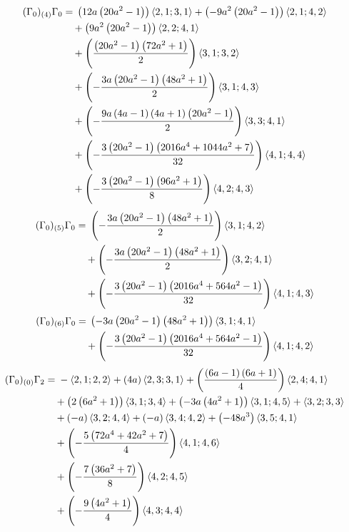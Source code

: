 \begin{align*}
(\Gamma_0)_{(4)}\Gamma_0 &={} \left(12 a \left(20 a^{2} - 1\right)\right)\langle 2,1;3,1\rangle + \left(- 9 a^{2} \left(20 a^{2} - 1\right)\right)\langle 2,1;4,2\rangle\\
&\quad {}+ \left(9 a^{2} \left(20 a^{2} - 1\right)\right)\langle 2,2;4,1\rangle\\
&\quad {}+ \left(\frac{\left(20 a^{2} - 1\right) \left(72 a^{2} + 1\right)}{2}\right)\langle 3,1;3,2\rangle\\
&\quad {}+ \left(- \frac{3 a \left(20 a^{2} - 1\right) \left(48 a^{2} + 1\right)}{2}\right)\langle 3,1;4,3\rangle\\
&\quad {}+ \left(- \frac{9 a \left(4 a - 1\right) \left(4 a + 1\right) \left(20 a^{2} - 1\right)}{2}\right)\langle 3,3;4,1\rangle\\
&\quad {}+ \left(- \frac{3 \left(20 a^{2} - 1\right) \left(2016 a^{4} + 1044 a^{2} + 7\right)}{32}\right)\langle 4,1;4,4\rangle\\
&\quad {}+ \left(- \frac{3 \left(20 a^{2} - 1\right) \left(96 a^{2} + 1\right)}{8}\right)\langle 4,2;4,3\rangle
\end{align*}
\begin{align*}
(\Gamma_0)_{(5)}\Gamma_0 &={} \left(- \frac{3 a \left(20 a^{2} - 1\right) \left(48 a^{2} + 1\right)}{2}\right)\langle 3,1;4,2\rangle\\
&\quad {}+ \left(- \frac{3 a \left(20 a^{2} - 1\right) \left(48 a^{2} + 1\right)}{2}\right)\langle 3,2;4,1\rangle\\
&\quad {}+ \left(- \frac{3 \left(20 a^{2} - 1\right) \left(2016 a^{4} + 564 a^{2} - 1\right)}{32}\right)\langle 4,1;4,3\rangle
\end{align*}
\begin{align*}
(\Gamma_0)_{(6)}\Gamma_0 &={} \left(- 3 a \left(20 a^{2} - 1\right) \left(48 a^{2} + 1\right)\right)\langle 3,1;4,1\rangle\\
&\quad {}+ \left(- \frac{3 \left(20 a^{2} - 1\right) \left(2016 a^{4} + 564 a^{2} - 1\right)}{32}\right)\langle 4,1;4,2\rangle
\end{align*}
\begin{align*}
(\Gamma_0)_{(0)}\Gamma_2 &={} -\langle 2,1;2,2\rangle + \left(4 a\right)\langle 2,3;3,1\rangle + \left(\frac{\left(6 a - 1\right) \left(6 a + 1\right)}{4}\right)\langle 2,4;4,1\rangle\\
&\quad {}+ \left(2 \left(6 a^{2} + 1\right)\right)\langle 3,1;3,4\rangle + \left(- 3 a \left(4 a^{2} + 1\right)\right)\langle 3,1;4,5\rangle + \langle 3,2;3,3\rangle\\
&\quad {}+ \left(- a\right)\langle 3,2;4,4\rangle + \left(- a\right)\langle 3,4;4,2\rangle + \left(- 48 a^{3}\right)\langle 3,5;4,1\rangle\\
&\quad {}+ \left(- \frac{5 \left(72 a^{4} + 42 a^{2} + 7\right)}{4}\right)\langle 4,1;4,6\rangle\\
&\quad {}+ \left(- \frac{7 \left(36 a^{2} + 7\right)}{8}\right)\langle 4,2;4,5\rangle\\
&\quad {}+ \left(- \frac{9 \left(4 a^{2} + 1\right)}{4}\right)\langle 4,3;4,4\rangle
\end{align*}
